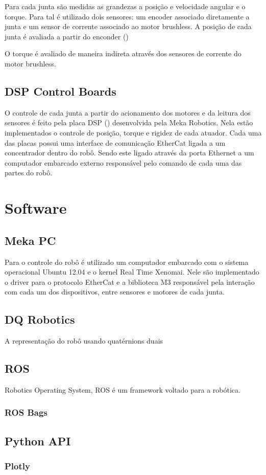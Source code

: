 Para cada junta são medidas as grandezas a posição e velocidade angular e o torque. Para tal é utilizado dois sensores: um encoder associado diretamente a junta e um sensor de corrente associado ao motor brushless. A posição de cada junta é avaliada a partir do enconder ()

O torque é avaliado de maneira indireta através dos sensores de corrente do motor brushless.

\subsection{DSP Control Boards}

O controle de cada junta a partir do acionamento dos motores e da leitura dos sensores é feito pela placa DSP () desenvolvida pela Meka Robotics. Nela estão implementados o controle de posição, torque e rigidez de cada atuador. Cada uma das placas possui uma interface de comunicação EtherCat ligada a um concentrador dentro do robô. Sendo este ligado através da porta Ethernet a um computador embarcado externo responsável pelo comando de cada uma das partes do robô.

\section{Software}


\subsection{Meka PC}

Para o controle do robô é utilizado um computador embarcado com o sistema operacional Ubuntu 12.04 e o kernel Real Time Xenomai. Nele são implementado o driver para o protocolo EtherCat e a biblioteca M3 responsável pela interação com cada um dos dispositivos, entre sensores e motores de cada junta.


\subsection{DQ Robotics}

A representação do robô usando quatérnions duais

\subsection{ROS}

Robotics Operating System, ROS é um framework voltado para a robótica. 

\subsubsection{ROS Bags}

\subsection{Python API}

\subsubsection{Plotly}